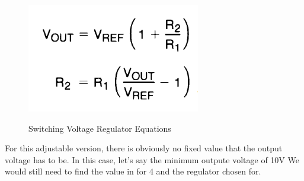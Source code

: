 \begin{figure}[H]
    \centering
    \caption{Switching Voltage Regulator Equations}
    \includegraphics[width=\textwidth]{images/LM2576_Adjustable_equations.png}
    \label{fig:switching-voltage-regulator-equations}
\end{figure}
For this adjustable version, there is obviously no fixed value that the output voltage has to be. In this case, let's say the minimum outpute voltage of 10V We would still need to find the value in for 4 and the regulator chosen for. \par
